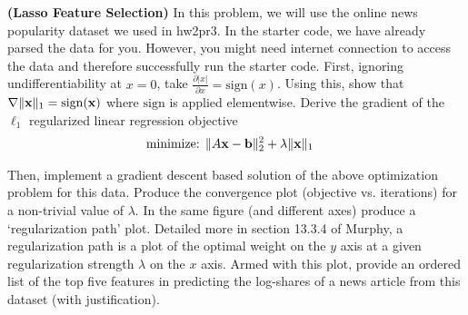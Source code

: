 \documentclass[12pt,letterpaper,fleqn]{hmcpset}
\begin{document}
\begin{problem}[2]
\textbf{(Lasso Feature Selection)} 
In this problem, we will use the online news popularity dataset we used in hw2pr3. In the starter code, we have already parsed the data for you. However, you might need internet connection to access the data and therefore successfully run the starter code.
\newline
\newline
First, ignoring undifferentiability at $x=0$, take $\frac{\partial |x|}{\partial x}
= \mathrm{sign} (x)$. Using this, show that $\nabla \|{\bf x}\|_1 = \mathrm{sign}({\bf x})$ where $\mathrm{sign}$ is applied
elementwise. Derive the gradient of the $\ell_1$ regularized linear regression objective
\begin{align*}
    \text{minimize: } & \|A{\bf x} - {\bf b}\|_2^2 + \lambda \|{\bf x}\|_1
\end{align*}

Then, implement a gradient descent based solution of the above optimization problem for this data. Produce
the convergence plot (objective vs. iterations) for a non-trivial value of $\lambda$.
In the same figure (and different axes) produce a `regularization path' plot. Detailed
more in section 13.3.4 of Murphy, a regularization path is a plot of the optimal weight on
the $y$ axis at a given regularization strength $\lambda$ on the $x$ axis. Armed with this
plot, provide an ordered list of the top five features in predicting the log-shares of a news
article from this dataset (with justification).
\end{problem}
\begin{solution}
\vfill
\end{solution}
\newpage
\end{document}
